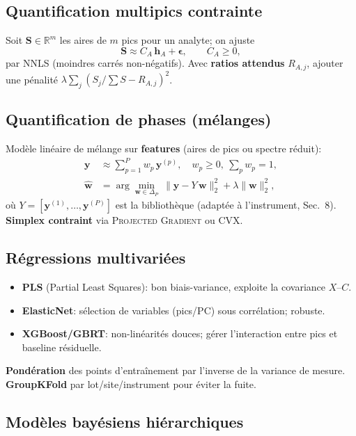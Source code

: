 \subsection{Quantification multipics contrainte}
Soit $\mathbf{S}\in\mathbb{R}^m$ les aires de $m$ pics pour un analyte; on ajuste
\begin{equation}
\mathbf{S} \approx C_A\,\mathbf{h}_A + \boldsymbol{\epsilon},\qquad C_A\ge 0,
\end{equation}
par NNLS (moindres carrés non-négatifs). Avec \textbf{ratios attendus} $R_{A,j}$, ajouter une pénalité $\lambda\sum_j (S_j/\sum S - R_{A,j})^2$.

\subsection{Quantification de phases (mélanges)}
Modèle linéaire de mélange sur \textbf{features} (aires de pics ou spectre réduit):
\begin{align}
\mathbf{y} &\approx \sum_{p=1}^{P} w_p\, \mathbf{y}^{(p)},\quad w_p \ge 0,\ \sum_p w_p = 1,\\
\hat{\mathbf{w}} &= \arg\min_{\mathbf{w}\in\Delta_P}\ \|\mathbf{y} - Y\,\mathbf{w}\|_2^2 + \lambda\|\mathbf{w}\|_2^2,
\end{align}
où $Y=[\mathbf{y}^{(1)},\ldots,\mathbf{y}^{(P)}]$ est la bibliothèque (adaptée à l'instrument, Sec.~8). \textbf{Simplex contraint} via \textsc{Projected Gradient} ou \textsc{CVX}.

\subsection{Régressions multivariées}
\begin{itemize}[nosep]
\item \textbf{PLS} (Partial Least Squares): bon biais-variance, exploite la covariance $X$--$C$.
\item \textbf{ElasticNet}: sélection de variables (pics/PC) sous corrélation; robuste.
\item \textbf{XGBoost/GBRT}: non-linéarités douces; gérer l'interaction entre pics et baseline résiduelle.
\end{itemize}
\textbf{Pondération} des points d'entraînement par l'inverse de la variance de mesure. \textbf{GroupKFold} par lot/site/instrument pour éviter la fuite.

\subsection{Modèles bayésiens hiérarchiques}
